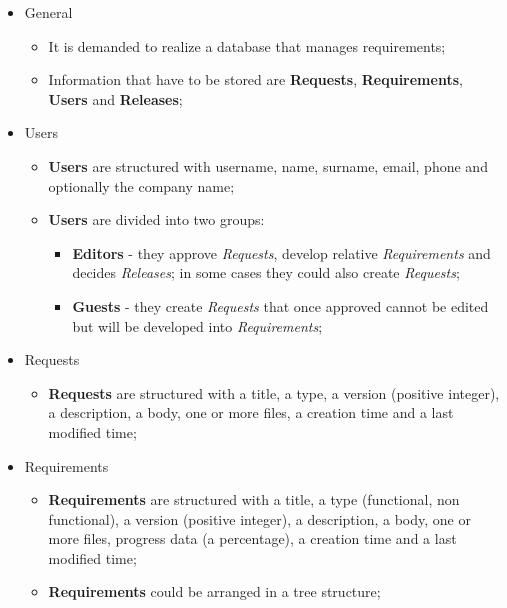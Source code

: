 \documentclass[12pt, a4paper]{report}
\begin{document}
\begin{itemize}
    \item General
    \begin{itemize}
        \item It is demanded to realize a database that manages requirements;
        \item Information that have to be stored are \textbf{Requests}, \textbf{Requirements}, \textbf{Users} and \textbf{Releases}; %
    \end{itemize}
    \item Users
    \begin{itemize}
        \item \textbf{Users} are structured with username, name, surname, email, phone and optionally the company name;
        \item \textbf{Users} are divided into two groups:
            \begin{itemize}
                \item \textbf{Editors} - they approve \emph{Requests}, develop relative \emph{Requirements} and decides \emph{Releases};
                    in some cases they could also create \emph{Requests};
                \item \textbf{Guests} - they create \emph{Requests} that once approved cannot be edited but will be developed into
                    \emph{Requirements};
            \end{itemize}
    \end{itemize}
    \item Requests
    \begin{itemize}
        \item \textbf{Requests} are structured with a title, a type, a version (positive integer), a description, a body, one or more
            files, a creation time and a last modified time;
    \end{itemize}
    \item Requirements
    \begin{itemize}
        \item \textbf{Requirements} are structured with a title, a type (functional, non functional), a version (positive integer),
            a description, a body, one or more files, progress data (a percentage), a creation time and a last modified time;
        \item \textbf{Requirements} could be arranged in a tree structure;
    \end{itemize}

\end{itemize}
\end{document}
